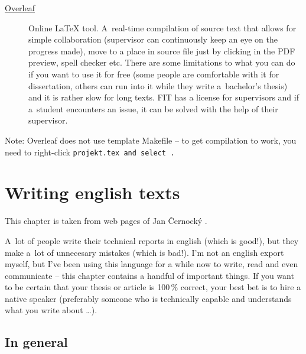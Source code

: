 \begin{description}
	\item[\href{http://www.overleaf.com/}{Overleaf}] Online \LaTeX{} tool. A~real-time compilation of source text that allows for simple collaboration (supervisor can continuously keep an eye on the progress made), move to a place in source file just by clicking in the PDF preview, spell checker etc. There are some limitations to what you can do if you want to use it for free (some people are comfortable with it for dissertation, others can run into it while they write a~bachelor's thesis) and it is rather slow for long texts. FIT has a license for supervisors and if a~student encounters an issue, it can be solved with the help of their supervisor.
\end{description}

Note: Overleaf does not use template Makefile -- to get compilation to work, you need to right-click \tt projekt.tex \rm and select .

\chapter{Writing english texts}
\label{anglicky}
This chapter is taken from web pages of Jan Černocký \cite{CernockyEnglish}.

A~lot of people write their technical reports in english (which is good!), but they make a~lot of unnecesary mistakes (which is bad!). I'm not an english export myself, but I've been using this language for a while now to write, read and even communicate -- this chapter contains a handful of important things. If you want to be certain that your thesis or article is 100\,\% correct, your best bet is to hire a native speaker (preferably someone who is technically capable and understands what you write about \ldots).


\section*{In general}

